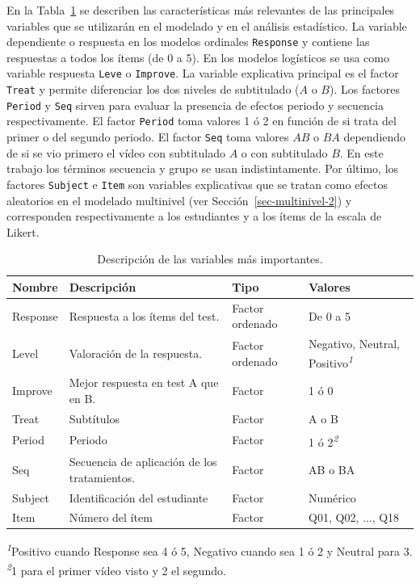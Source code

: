\documentclass[
  12pt,
  a4paper,
  extrafontsizes,
  onecolumn,
  openright,
  table]{memoir}
\begin{document}
En la Tabla~\ref{tbl-variables} se describen las características más
relevantes de las principales variables que se utilizarán en el modelado
y en el análisis estadístico. La variable dependiente o respuesta en los
modelos ordinales \texttt{Response} y contiene las respuestas a todos
los ítems (de 0 a 5). En los modelos logísticos se usa como variable
respuesta \texttt{Leve} o \texttt{Improve}. La variable explicativa
principal es el factor \texttt{Treat} y permite diferenciar los dos
niveles de subtitulado (\(A\) o \(B\)). Los factores \texttt{Period} y
\texttt{Seq} sirven para evaluar la presencia de efectos periodo y
secuencia respectivamente. El factor \texttt{Period} toma valores 1 ó 2
en función de si trata del primer o del segundo periodo. El factor
\texttt{Seq} toma valores \(AB\) o \(BA\) dependiendo de si se vio
primero el vídeo con subtitulado \(A\) o con subtitulado \(B\). En este
trabajo los términos secuencia y grupo se usan indistintamente. Por
último, los factores \texttt{Subject} e \texttt{Item} son variables
explicativas que se tratan como efectos aleatorios en el modelado
multinivel (ver Sección~\ref{sec-multinivel-2}) y corresponden
respectivamente a los estudiantes y a los ítems de la escala de Likert.

\footnotesize

\hypertarget{tbl-variables}{}
\setlength{\LTpost}{0mm}
\begin{longtable}{llll}
\caption{\label{tbl-variables}Descripción de las variables más importantes. }\tabularnewline

\toprule
Nombre & Descripción & Tipo & Valores \\ 
\midrule
Response & Respuesta a los ítems del test. & Factor ordenado & De 0 a 5 \\ 
Level & Valoración de la respuesta. & Factor ordenado & Negativo, Neutral, Positivo\textsuperscript{\textit{1}} \\ 
Improve & Mejor respuesta en test A que en B. & Factor & 1 ó 0 \\ 
Treat & Subtítulos & Factor & A o B \\ 
Period & Periodo & Factor & 1 ó 2\textsuperscript{\textit{2}} \\ 
Seq & Secuencia de aplicación de los tratamientos. & Factor & AB o BA \\ 
Subject & Identificación del estudiante & Factor & Numérico \\ 
Item & Número del ítem & Factor & Q01, Q02, ..., Q18 \\ 
\bottomrule
\end{longtable}
\begin{minipage}{\linewidth}
\textsuperscript{\textit{1}}Positivo cuando Response sea 4 ó 5, Negativo cuando sea 1 ó 2 y Neutral para 3.\\
\textsuperscript{\textit{2}}1 para el primer vídeo visto y 2 el segundo.\\
\end{minipage}
\end{document}
